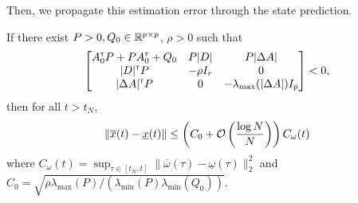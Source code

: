 \documentclass{article}
\begin{document}
Then, we propagate this estimation error through the state prediction.

\begin{lemma}
If there exist $P>0,Q_0\in\mathbb{R}^{p\times p}$, $\rho>0$ such that
\begin{align*}
\begin{bmatrix}
A_0^{\mathsf{\scriptscriptstyle T}} P + P A_0^{\mathsf{\scriptscriptstyle T}} + Q_0 & P|D| & P|\Delta A| \\
|D|^{\mathsf{\scriptscriptstyle T}} P & -\rho I_r & 0\\
|\Delta A|^{\mathsf{\scriptscriptstyle T}} P & 0 & -\lambda_{\max}(|\Delta A|) I_p
\end{bmatrix}< 0,
\end{align*}
then for all $t> t_N$,
\[\|\overline{x}(t) - \underline{x}(t)\| \leq \left(C_0 + \mathcal{O}\left({\frac{\log N}{N}} \right)\right)C_\omega(t) \]
where $C_\omega(t) = \sup_{\tau\in[t_N,t]} \|\overline{\omega}(\tau) - \underline{\omega}(\tau)\|_2^2$ and $C_0 = \sqrt{{\rho\lambda_{\max}(P)}/({\lambda_{\min}(P)\lambda_{\min}(Q_0)})}$.
\end{lemma}
\end{document}
